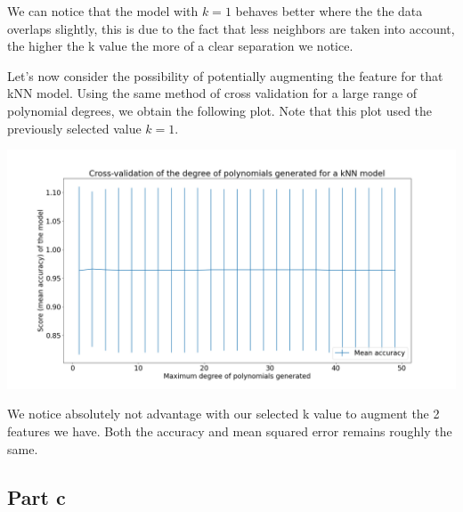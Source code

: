 \documentclass[10pt]{article}
\begin{document}
We can notice that the model with $ k = 1 $ behaves better where the
the data overlaps slightly, this is due to the fact that less neighbors are
taken into account, the higher the k value the more of a clear separation we notice.

Let's now consider the possibility of potentially augmenting the feature for that kNN model.
Using the same method of cross validation for a large range of polynomial degrees, we obtain the following plot.
Note that this plot used the previously selected value $ k = 1 $.

\begin{center}
    \includegraphics[scale=0.25]{ds_1_knn_d_cv.png}
\end{center}
\vspace{5mm} %
We notice absolutely not advantage with our selected k value to augment the 2 features we have.
Both the accuracy and mean squared error remains roughly the same.

\subsection*{Part c}
\end{document}
